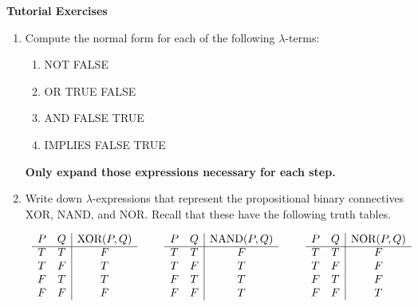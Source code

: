 \documentclass[11pt]{report}
\begin{document}
\newpage
{\bf Tutorial Exercises}
\begin{enumerate}
	
	\item Compute the normal form for each of the following $\lambda$-terms:
	
		\begin{enumerate}
			\item NOT FALSE
			\item OR TRUE FALSE
			\item AND FALSE TRUE 
			\item IMPLIES FALSE TRUE 
		\end{enumerate} 

	{\bf Only expand those expressions necessary for each step.}
		
	\item Write down $\lambda$-expressions that represent the propositional binary connectives XOR, NAND, and NOR. Recall that these have the following truth tables.
			
	\vspace{0.5cm}

	\begin{center}
		$\begin{array}{c c c}

			\begin{array}{ c c | c }			
				P & Q & \text{XOR}(P,Q)\\
				\cline{1 - 3}
				T & T & F \\ 
				T & F & T \\ 
				F & T & T \\ 
				F & F & F
			\end{array} 
			& \hspace{0.5cm}
			\begin{array}{ c c | c }			
				P & Q & \text{NAND}(P,Q)\\
				\cline{1 - 3}
				T & T & F \\ 
				T & F & T \\ 
				F & T & T \\ 
				F & F & T
			\end{array} 
			& \hspace{0.5cm}
			\begin{array}{ c c | c }			
				P & Q & \text{NOR}(P,Q)\\
				\cline{1 - 3}
				T & T & F \\ 
				T & F & F \\ 
				F & T & F \\ 
				F & F & T
			\end{array} 
		\end{array}$
	\end{center}
	\vspace{0.2cm}


\end{enumerate}
\end{document}
